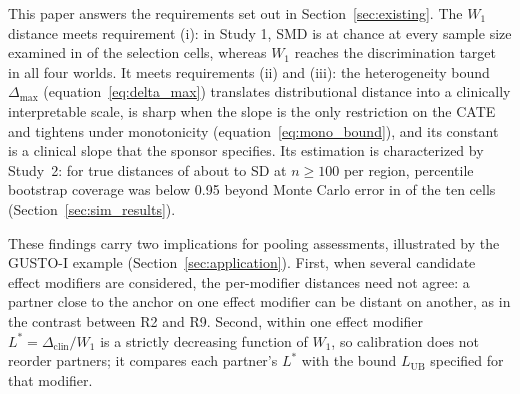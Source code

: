 \documentclass[AMA,Times1COL]{WileyNJDv5}
\begin{document}
This paper answers the requirements set out in Section~\ref{sec:existing}. The $W_1$ distance meets requirement (i): in Study 1, SMD is at chance at every sample size examined in  of the  selection cells, whereas $W_1$ reaches the discrimination target in all four worlds. It meets requirements (ii) and (iii): the heterogeneity bound \(\Delta_{\max}\) (equation~\ref{eq:delta_max}) translates distributional distance into a clinically interpretable scale, is sharp when the slope is the only restriction on the CATE and tightens under monotonicity (equation~\ref{eq:mono_bound}), and its constant is a clinical slope that the sponsor specifies. Its estimation is characterized by Study~2: for true distances of about  to  SD at $n \geq 100$ per region, percentile bootstrap coverage was below 0.95 beyond Monte Carlo error in  of the ten cells (Section~\ref{sec:sim_results}).

These findings carry two implications for pooling assessments, illustrated by the GUSTO-I example (Section~\ref{sec:application}). First, when several candidate effect modifiers are considered, the per-modifier distances need not agree: a partner close to the anchor on one effect modifier can be distant on another, as in the contrast between R2 and R9. Second, within one effect modifier $L^* = \Delta_{\text{clin}} / W_1$ is a strictly decreasing function of $W_1$, so calibration does not reorder partners; it compares each partner's $L^*$ with the bound $L_{\text{UB}}$ specified for that modifier.
\end{document}
